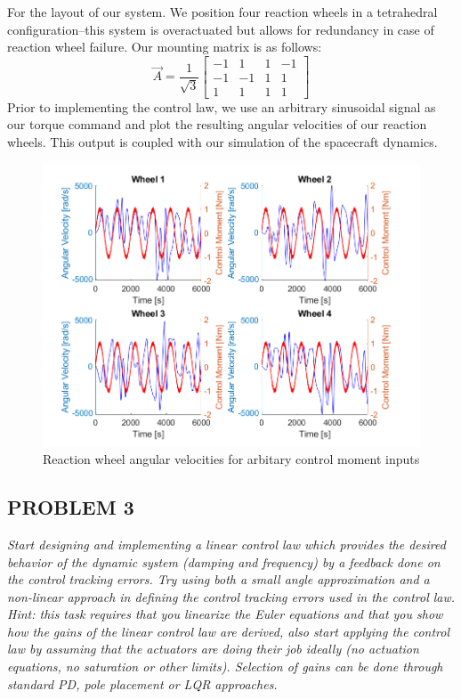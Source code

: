 For the layout of our system. We position four reaction wheels in a tetrahedral configuration–this system is overactuated but allows for redundancy in case of reaction wheel failure. Our mounting matrix is as follows:
\begin{equation*}
    \Vec{A} = \frac{1}{\sqrt{3}} \begin{bmatrix}
        -1 & 1 & 1 & -1 \\
        -1 & -1 & 1 & 1 \\
        1 & 1 & 1 & 1
    \end{bmatrix}
\end{equation*}
Prior to implementing the control law, we use an arbitrary sinusoidal signal as our torque command and plot the resulting angular velocities of our reaction wheels. This output is coupled with our simulation of the spacecraft dynamics.

\begin{figure}[H]
\centering
\includegraphics[scale=0.9]{Images/ps9_problem2.png}
\caption{Reaction wheel angular velocities for arbitary control moment inputs}
\label{fig:ps9_problem2}
\end{figure}

\subsection{PROBLEM 3}
\textit{Start designing and implementing a linear control law which provides the desired behavior of the dynamic system (damping and frequency) by a feedback done on the control tracking errors. Try using both a small angle approximation and a non-linear approach in defining the control tracking errors used in the control law. Hint: this task requires that you linearize the Euler equations and that you show how the gains of the linear control law are derived, also start applying the control law by assuming that the actuators are doing their job ideally (no actuation equations, no saturation or other limits). Selection of gains can be done through standard PD, pole placement or LQR approaches.}

